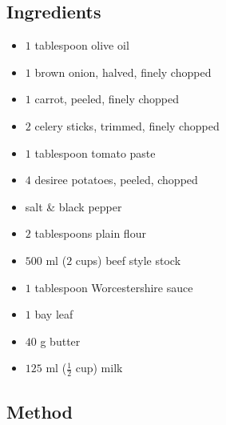 \documentclass[11pt,a4paper]{article}
\begin{document}
\subsection*{Ingredients}

\begin{multicols}{2}




\begin{itemize}
  \item $ 1 $ tablespoon olive oil
  \item $ 1 $ brown onion, halved, finely chopped
  \item $ 1 $ carrot, peeled, finely chopped
  \item $ 2 $ celery sticks, trimmed, finely chopped
  \item $ 1 $ tablespoon tomato paste
  \item $ 4 $ desiree potatoes, peeled, chopped
\end{itemize}

\columnbreak

\begin{itemize}
  \item salt \& black pepper
  \item $ 2 $ tablespoons plain flour
  \item $ 500 $ \si{\milli\litre} ($ 2 $ cups) beef style stock
  \item $ 1 $ tablespoon Worcestershire sauce
  \item $ 1 $ bay leaf
  \item $ 40 $ \si{\gram} butter
  \item $ 125 $ \si{\milli\litre} ($ \frac{1}{2} $ cup) milk
\end{itemize}

\end{multicols}

\medskip

\subsection*{Method}
\end{document}
